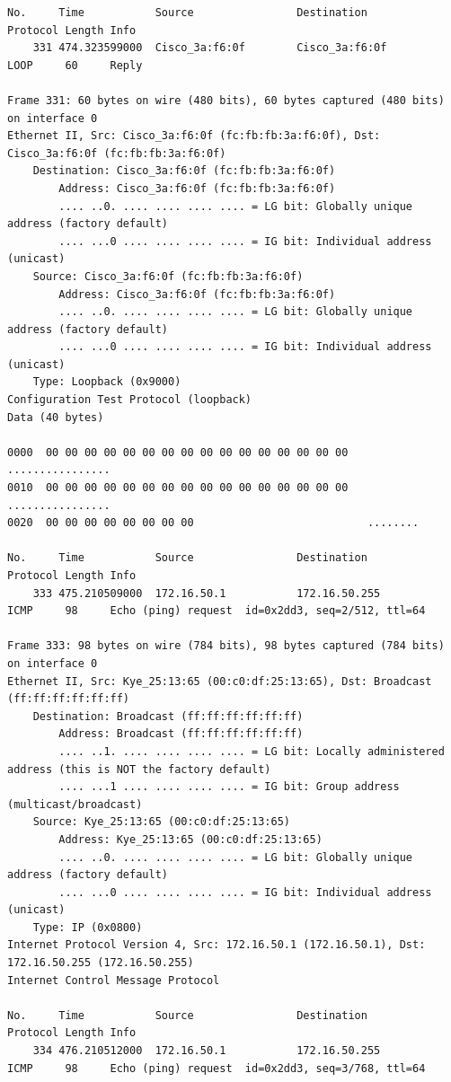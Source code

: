 \documentclass[a4paper,11pt]{article}
\begin{document}
\begin{lstlisting}
No.     Time           Source                Destination           Protocol Length Info
    331 474.323599000  Cisco_3a:f6:0f        Cisco_3a:f6:0f        LOOP     60     Reply

Frame 331: 60 bytes on wire (480 bits), 60 bytes captured (480 bits) on interface 0
Ethernet II, Src: Cisco_3a:f6:0f (fc:fb:fb:3a:f6:0f), Dst: Cisco_3a:f6:0f (fc:fb:fb:3a:f6:0f)
    Destination: Cisco_3a:f6:0f (fc:fb:fb:3a:f6:0f)
        Address: Cisco_3a:f6:0f (fc:fb:fb:3a:f6:0f)
        .... ..0. .... .... .... .... = LG bit: Globally unique address (factory default)
        .... ...0 .... .... .... .... = IG bit: Individual address (unicast)
    Source: Cisco_3a:f6:0f (fc:fb:fb:3a:f6:0f)
        Address: Cisco_3a:f6:0f (fc:fb:fb:3a:f6:0f)
        .... ..0. .... .... .... .... = LG bit: Globally unique address (factory default)
        .... ...0 .... .... .... .... = IG bit: Individual address (unicast)
    Type: Loopback (0x9000)
Configuration Test Protocol (loopback)
Data (40 bytes)

0000  00 00 00 00 00 00 00 00 00 00 00 00 00 00 00 00   ................
0010  00 00 00 00 00 00 00 00 00 00 00 00 00 00 00 00   ................
0020  00 00 00 00 00 00 00 00                           ........

No.     Time           Source                Destination           Protocol Length Info
    333 475.210509000  172.16.50.1           172.16.50.255         ICMP     98     Echo (ping) request  id=0x2dd3, seq=2/512, ttl=64

Frame 333: 98 bytes on wire (784 bits), 98 bytes captured (784 bits) on interface 0
Ethernet II, Src: Kye_25:13:65 (00:c0:df:25:13:65), Dst: Broadcast (ff:ff:ff:ff:ff:ff)
    Destination: Broadcast (ff:ff:ff:ff:ff:ff)
        Address: Broadcast (ff:ff:ff:ff:ff:ff)
        .... ..1. .... .... .... .... = LG bit: Locally administered address (this is NOT the factory default)
        .... ...1 .... .... .... .... = IG bit: Group address (multicast/broadcast)
    Source: Kye_25:13:65 (00:c0:df:25:13:65)
        Address: Kye_25:13:65 (00:c0:df:25:13:65)
        .... ..0. .... .... .... .... = LG bit: Globally unique address (factory default)
        .... ...0 .... .... .... .... = IG bit: Individual address (unicast)
    Type: IP (0x0800)
Internet Protocol Version 4, Src: 172.16.50.1 (172.16.50.1), Dst: 172.16.50.255 (172.16.50.255)
Internet Control Message Protocol

No.     Time           Source                Destination           Protocol Length Info
    334 476.210512000  172.16.50.1           172.16.50.255         ICMP     98     Echo (ping) request  id=0x2dd3, seq=3/768, ttl=64


\end{lstlisting}
\end{document}
